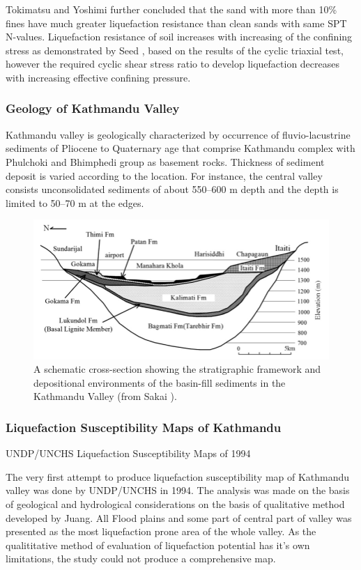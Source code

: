 Tokimatsu and Yoshimi \cite{r17} further concluded that the sand with more than 10\% fines have much greater liquefaction resistance than clean sands with same SPT N-values. Liquefaction resistance of soil increases with increasing of the confining stress as demonstrated by Seed \cite{r16}, based on the results of the cyclic triaxial test, however the required cyclic shear stress ratio to develop liquefaction decreases with increasing effective confining pressure.

\subsubsection{Geology of Kathmandu Valley}
Kathmandu valley is geologically characterized by occurrence of fluvio-lacustrine sediments of Pliocene to Quaternary age that comprise Kathmandu complex with Phulchoki and Bhimphedi group as basement rocks. Thickness of sediment deposit is varied according to the location. For instance, the central valley consists unconsolidated sediments of about 550–600 m depth and the depth is limited to 50–70 m at the edges. 

\begin{figure}[!hbt]
\centering
\includegraphics[width=0.75\linewidth,keepaspectratio]{images/main/geological_cross_section.png}
\caption{A schematic cross-section showing the stratigraphic framework and depositional environments of the basin-fill sediments in the Kathmandu Valley (from Sakai \cite{r24}).}
\end{figure}

\subsubsection{Liquefaction Susceptibility Maps of Kathmandu}
UNDP/UNCHS Liquefaction Susceptibility Maps of 1994

The very first attempt to produce liquefaction susceptibility map of Kathmandu valley was done by UNDP/UNCHS in 1994. The analysis was made on the basis of geological and hydrological considerations on the basis of qualitative method developed by Juang\cite{r25}. All Flood plains and some part of central part of valley was presented as the most liquefaction prone area of the whole valley.  As the qualititative method of evaluation of liquefaction potential has it’s own limitations, the study could not produce a comprehensive  map.

